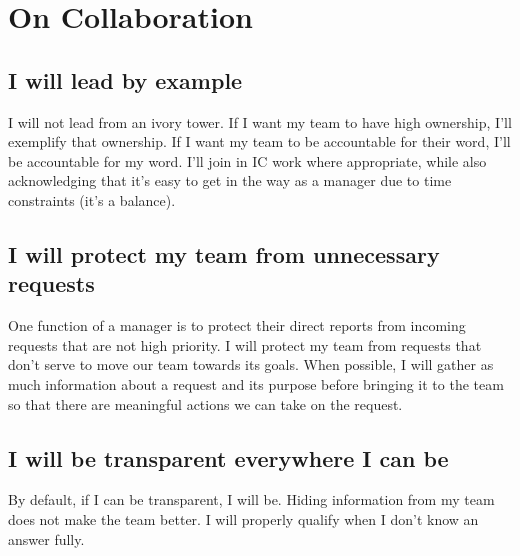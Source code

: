 \documentclass[11pt]{amsart}
\begin{document}

\section{On Collaboration}

\subsection{I will lead by example}
I will not lead from an ivory tower. If I want my team to have high ownership, I'll exemplify that ownership. If I want my team to be accountable for their word, I'll be accountable for my word. I'll join in IC work where appropriate, while also acknowledging that it's easy to get in the way as a manager due to time constraints (it's a balance).

\subsection{I will protect my team from unnecessary requests}
One function of a manager is to protect their direct reports from incoming requests that are not high priority. I will protect my team from requests that don’t serve to move our team towards its goals. When possible, I will gather as much information about a request and its purpose before bringing it to the team so that there are meaningful actions we can take on the request.

\subsection{I will be transparent everywhere I can be}
By default, if I can be transparent, I will be. Hiding information from my team does not make the team better. I will properly qualify when I don’t know an answer fully.

\end{document}
